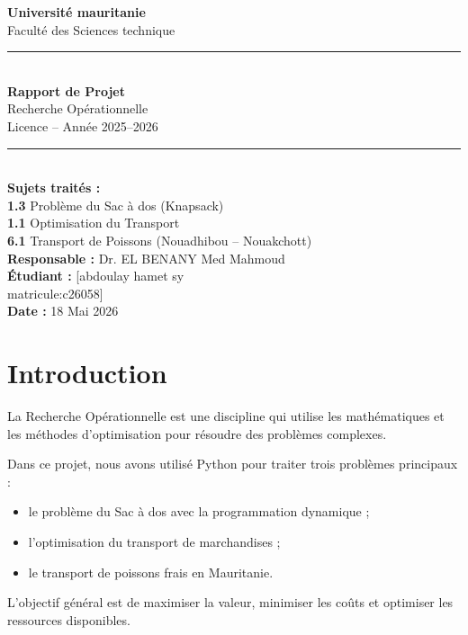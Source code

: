 \documentclass[12pt,a4paper]{article}
\begin{document}
\begin{titlepage}
  \centering
  \vspace*{2cm}
  {\Large \textbf{Université mauritanie}\\
  Faculté des Sciences technique\\[0.5cm]}
  \rule{\linewidth}{0.5mm}\\[1cm]
  {\Huge \textbf{Rapport de Projet}}\\[0.5cm]
  {\LARGE Recherche Opérationnelle}\\[0.3cm]
  {\large Licence -- Année 2025--2026}\\[1cm]
  \rule{\linewidth}{0.5mm}\\[1cm]
  {\large \textbf{Sujets traités :}}\\[0.5cm]
  {\large
  \textbf{1.3} Problème du Sac à dos (Knapsack)\\[0.3cm]
  \textbf{1.1} Optimisation du Transport\\[0.3cm]
  \textbf{6.1} Transport de Poissons (Nouadhibou -- Nouakchott)\\
  }
  \vfill
  {\large
  \textbf{Responsable :} Dr. EL BENANY Med Mahmoud\\[0.3cm]
  \textbf{Étudiant :} [abdoulay hamet sy\\ matricule:c26058]\\[0.3cm]
  \textbf{Date :} 18 Mai 2026
  }
\end{titlepage}

\tableofcontents
\newpage

\section{Introduction}

La Recherche Opérationnelle est une discipline qui utilise les
mathématiques et les méthodes d'optimisation pour résoudre des
problèmes complexes.

Dans ce projet, nous avons utilisé Python pour traiter trois
problèmes principaux :
\begin{itemize}
  \item le problème du Sac à dos avec la programmation dynamique ;
  \item l'optimisation du transport de marchandises ;
  \item le transport de poissons frais en Mauritanie.
\end{itemize}

L'objectif général est de maximiser la valeur, minimiser les coûts
et optimiser les ressources disponibles.
\end{document}
